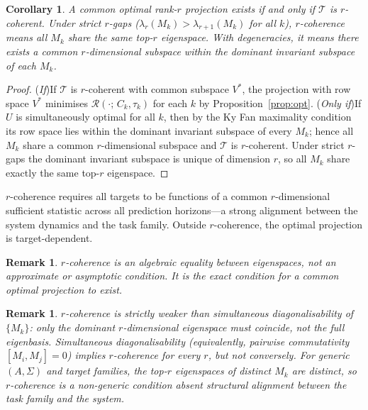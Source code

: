 \documentclass[final,3p,times]{elsarticle}
\newtheorem{corollary}[theorem]{Corollary}
\newtheorem{remark}[theorem]{Remark}
\begin{document}
\begin{corollary}\label{cor:coherence}
A common optimal rank-$r$ projection exists if and only if $\mathcal{T}$ is
$r$-coherent.
Under strict $r$-gaps ($\lambda_r(M_k)>\lambda_{r+1}(M_k)$ for all $k$),
$r$-coherence means all $M_k$ share the same top-$r$ eigenspace.
With degeneracies, it means there exists a common $r$-dimensional subspace
within the dominant invariant subspace of each $M_k$.
\end{corollary}

\begin{proof}
(\emph{If})\enspace If $\mathcal{T}$ is $r$-coherent with common subspace
$V^*$, the projection with row space $V^*$ minimises
$\mathcal{R}(\cdot;\,C_k,\tau_k)$ for each $k$ by Proposition~\ref{prop:opt}.
(\emph{Only if})\enspace If $U$ is simultaneously optimal for all $k$, then
by the Ky Fan maximality condition its row space lies within the dominant
invariant subspace of every $M_k$; hence all $M_k$ share a common
$r$-dimensional subspace and $\mathcal{T}$ is $r$-coherent.
Under strict $r$-gaps the dominant invariant subspace is unique of dimension
$r$, so all $M_k$ share exactly the same top-$r$ eigenspace.
\end{proof}

$r$-coherence requires all targets to be functions of a common $r$-dimensional
sufficient statistic across all prediction horizons---a strong alignment
between the system dynamics and the task family.
Outside $r$-coherence, the optimal projection is target-dependent.

\begin{remark}
$r$-coherence is an algebraic equality between eigenspaces, not an
approximate or asymptotic condition.
It is the exact condition for a common optimal projection to exist.
\end{remark}

\begin{remark}
$r$-coherence is strictly weaker than simultaneous diagonalisability of
$\{M_k\}$: only the dominant $r$-dimensional eigenspace must coincide,
not the full eigenbasis.
Simultaneous diagonalisability (equivalently, pairwise commutativity
$[M_i,M_j]=0$) implies $r$-coherence for every $r$, but not conversely.
For generic $(A,\Sigma)$ and target families, the top-$r$ eigenspaces of
distinct $M_k$ are distinct, so $r$-coherence is a non-generic condition
absent structural alignment between the task family and the system.
\end{remark}
\end{document}
